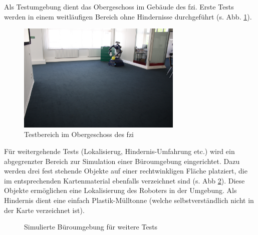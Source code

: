 Als Testumgebung dient das Obergeschoss im Gebäude des \gls{fzi}.
Erste Tests werden in einem weitläufigen Bereich ohne Hindernisse durchgeführt (s. Abb. \ref{fig:fzi_og}).
\begin{figure}
	\centering
	\includegraphics[width=0.7\textwidth]{graphics/fzi_og}
	\caption{Testbereich im Obergeschoss des \protect\gls{fzi}}
	\label{fig:fzi_og}
\end{figure}

Für weitergehende Tests (Lokalisierug, Hindernis-Umfahrung etc.) wird ein abgegrenzter Bereich zur Simulation einer Büroumgebung eingerichtet.
Dazu werden drei fest stehende Objekte auf einer rechtwinkligen Fläche platziert, die im entsprechenden Kartenmaterial ebenfalls verzeichnet sind (s. Abb \ref{fig:map_fzi}).
Diese Objekte ermöglichen eine Lokalisierung des Roboters in der Umgebung.
Als Hindernis dient eine einfach Plastik-Mülltonne (welche selbstverständlich nicht in der Karte verzeichnet ist).

\begin{figure}[h]
  \centering
  \quad %
  \caption{Simulierte Büroumgebung für weitere Tests}
  \label{fig:map_fzi}
\end{figure}

